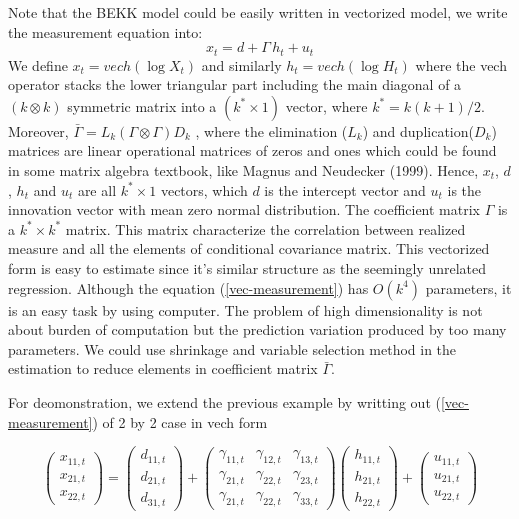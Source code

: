 \documentclass[titlepage,11pt]{article}
\begin{document}
Note that the BEKK model could be easily written in vectorized model, we write the measurement equation into:
\begin{equation}
\label{vec-measurement}
x_t= d+ \Gamma \, h_{t}+ u_{t}
\end{equation}
We define $x_t = vech(\log X_t)$ and similarly $h_t = vech(\log H_t)$ where the vech operator stacks the lower triangular part including the main diagonal of a $(k \otimes k)$ symmetric matrix into a $(k^* \times 1)$  vector, where $k^*= k(k+1)/2$. Moreover, $\bar{\Gamma} = L_k(\Gamma\otimes \Gamma)D_k$ , where the elimination ($L_k$) and duplication($D_k$) matrices are linear operational matrices of zeros and ones which could be found in some matrix algebra textbook, like Magnus and Neudecker (1999). 
Hence, $x_t$, $d$, $h_t$ and $u_t$ are all  $k^* \times 1$ vectors, which $d$ is the intercept vector and $u_t$ is the innovation vector with mean zero normal distribution.  The coefficient matrix $\Gamma$ is a $k^* \times k^*$ matrix.  This matrix characterize the correlation between realized measure and all the elements of conditional covariance matrix. This vectorized form is easy to estimate since it's similar structure as the seemingly unrelated regression. Although the equation (\ref{vec-measurement})  has $O(k^4)$ parameters, it is an easy task by using computer. The problem of high dimensionality is not about  burden of computation but the prediction variation produced by too many parameters. We could use shrinkage and variable selection method in the estimation to reduce elements in coefficient matrix $\bar{\Gamma}$.


For deomonstration, we extend the previous example by writting out (\ref{vec-measurement}) of 2 by 2 case in vech form 

\begin{equation*}
\left(\begin{array}{c}
x_{11,t}  \\
x_{21,t} \\
x_{22,t}\end{array}\right) = 
\left( \begin{array}{c}
d_{11,t}  \\
d_{21,t} \\
d_{31,t}\end{array}\right)
+ \left( \begin{array}{ccc}
\gamma_{11,t} & \gamma_{12,t}  & \gamma_{13,t} \\
\gamma_{21,t} & \gamma_{22,t}  & \gamma_{23,t} \\
\gamma_{21,t} & \gamma_{22,t}  & \gamma_{33,t}
\end{array} \right) 
\left(\begin{array}{c}
h_{11,t} \\
h_{21,t} \\
h_{22,t}
\end{array}\right)
+ \left(\begin{array}{c}
u_{11,t} \\
u_{21,t} \\
u_{22,t}
\end{array} \right)
\end{equation*}
\end{document}
